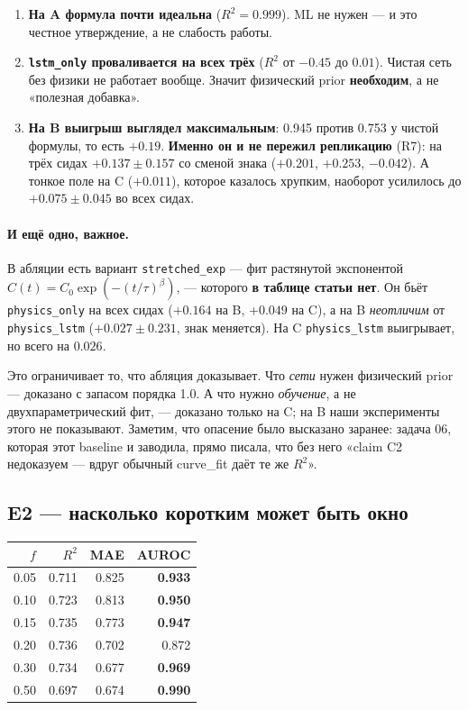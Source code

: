 \documentclass[12pt,a4paper]{article}
\newcommand{\code}[1]{\texttt{#1}}
\begin{document}
\begin{enumerate}
  \item \textbf{На A формула почти идеальна} ($R^2=0.999$). ML не нужен — и это
        честное утверждение, а не слабость работы.
  \item \textbf{\code{lstm\_only} проваливается на всех трёх} ($R^2$ от $-0.45$
        до $0.01$). Чистая сеть без физики не работает вообще. Значит
        физический prior \textbf{необходим}, а не «полезная добавка».
  \item \textbf{На B выигрыш выглядел максимальным}: 0.945 против 0.753 у чистой
        формулы, то есть $+0.19$. \textbf{Именно он и не пережил репликацию}
        (R7): на трёх сидах $+0.137\pm0.157$ со сменой знака
        ($+0.201$, $+0.253$, $-0.042$). А тонкое поле на C ($+0.011$),
        которое казалось хрупким, наоборот усилилось до $+0.075\pm0.045$
        во всех сидах.
\end{enumerate}

\paragraph{И ещё одно, важное.} В абляции есть вариант \code{stretched\_exp} —
фит растянутой экспонентой $C(t)=C_0\exp(-(t/\tau)^\beta)$, — которого
\textbf{в таблице статьи нет}. Он бьёт \code{physics\_only} на всех сидах
($+0.164$ на B, $+0.049$ на C), а на B \emph{неотличим} от \code{physics\_lstm}
($+0.027\pm0.231$, знак меняется). На C \code{physics\_lstm} выигрывает, но
всего на $0.026$.

Это ограничивает то, что абляция доказывает. Что \emph{сети} нужен физический
prior — доказано с запасом порядка 1.0. А что нужно \emph{обучение}, а не
двухпараметрический фит, — доказано только на C; на B наши эксперименты этого
не показывают. Заметим, что опасение было высказано заранее: задача 06, которая
этот baseline и заводила, прямо писала, что без него «claim C2 недоказуем —
вдруг обычный curve\_fit даёт те же $R^2$».

\subsection{E2 — насколько коротким может быть окно}

\begin{center}
\begin{tabular}{@{}rrrr@{}}
\toprule
$f$ & $R^2$ & MAE & AUROC \\
\midrule
0.05 & 0.711 & 0.825 & \textbf{0.933} \\
0.10 & 0.723 & 0.813 & \textbf{0.950} \\
0.15 & 0.735 & 0.773 & \textbf{0.947} \\
0.20 & 0.736 & 0.702 & 0.872 \\
0.30 & 0.734 & 0.677 & \textbf{0.969} \\
0.50 & 0.697 & 0.674 & \textbf{0.990} \\
\bottomrule
\end{tabular}
\end{center}
\end{document}

